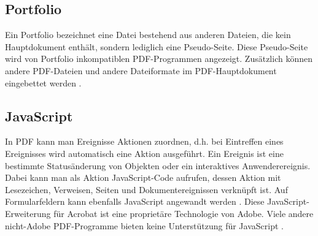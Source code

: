 \subsection{Portfolio}
Ein Portfolio bezeichnet eine Datei bestehend aus anderen Dateien, die kein Hauptdokument enthält, sondern lediglich eine Pseudo-Seite. Diese Pseudo-Seite wird von Portfolio inkompatiblen PDF-Programmen angezeigt. Zusätzlich können andere PDF-Dateien und andere Dateiformate im PDF-Hauptdokument eingebettet werden \cite{softx}. 

\subsection{JavaScript}
In PDF kann man Ereignisse Aktionen zuordnen, d.h. bei Eintreffen eines Ereignisses wird automatisch eine Aktion ausgeführt. Ein Ereignis ist eine bestimmte Statusänderung von Objekten oder ein interaktives Anwenderereignis. Dabei kann man als Aktion JavaScript-Code aufrufen, dessen Aktion mit Lesezeichen, Verweisen, Seiten und Dokumentereignissen verknüpft ist. Auf Formularfeldern kann ebenfalls JavaScript angewandt werden \cite{softx}. Diese JavaScript-Erweiterung für Acrobat ist eine proprietäre Technologie von Adobe. Viele andere nicht-Adobe PDF-Programme bieten keine Unterstützung für JavaScript \cite{wiki-pdf-engl}. 
